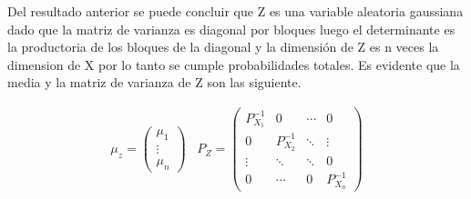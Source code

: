 	Del resultado anterior se puede concluir que Z es una variable aleatoria gaussiana dado que la matriz de varianza es diagonal por bloques luego el determinante es la productoria de los bloques de la diagonal y la dimensión de Z es n veces la dimension de X por lo tanto se cumple probabilidades totales.  Es evidente que la media y la matriz de varianza de Z son las siguiente.

	\begin{eqnarray}
		\mu_z = \begin{pmatrix}
			   \mu_1 \\
			  \vdots \\
			  \mu_n 
			 \end{pmatrix}\;\;\;
		P_Z =  \begin{pmatrix}
			  P_{X_1}^{-1} & 0 & \cdots & 0 \\
			  0 & P_{X_2}^{-1} &  \ddots & \vdots\\
			   \vdots & \ddots &\ddots  & 0\\
			   0 & \cdots &  0 & P_{X_n}^{-1}
			 \end{pmatrix}
	\end{eqnarray}







